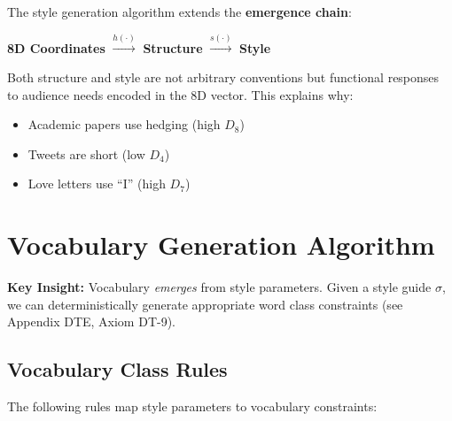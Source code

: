 \begin{tcolorbox}[colback=yellow!5!white, colframe=yellow!75!black,
    title=Key Insight: Emergent Style]

The style generation algorithm extends the \textbf{emergence chain}:

\begin{center}
\textbf{8D Coordinates} $\xrightarrow{h(\cdot)}$ \textbf{Structure} $\xrightarrow{s(\cdot)}$ \textbf{Style}
\end{center}

Both structure and style are not arbitrary conventions but functional responses
to audience needs encoded in the 8D vector. This explains why:
\begin{itemize}[nosep]
\item Academic papers use hedging (high $D_8$)
\item Tweets are short (low $D_4$)
\item Love letters use ``I'' (high $D_7$)
\end{itemize}

\end{tcolorbox}


\section{Vocabulary Generation Algorithm}
\label{sec:doctype-vocabulary}

\textbf{Key Insight:} Vocabulary \textit{emerges} from style parameters.
Given a style guide $\sigma$, we can deterministically generate appropriate
word class constraints (see Appendix DTE, Axiom DT-9).

\subsection{Vocabulary Class Rules}

The following rules map style parameters to vocabulary constraints:

